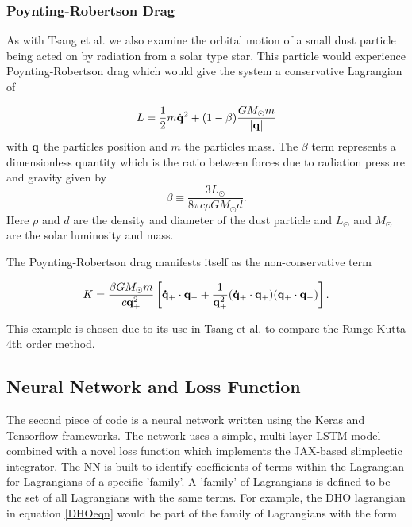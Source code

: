 \documentclass[10pt]{iopart}
\begin{document}
\subsubsection{Poynting-Robertson Drag \\}
\label{PRD}
As with Tsang et al. \cite{Tsang_Slimplectic} we also examine the orbital motion of a small dust particle being acted on by radiation from a solar type star. This particle would experience Poynting-Robertson drag \cite{Poynting-Robertson} which would give the system a conservative Lagrangian of 

\begin{equation}
	L = \frac{1}{2}m\dot{\bold{q}}^2 + (1-\beta)\frac{GM_\odot m}{|\bold{q}|}
\end{equation} 
with $\bold{q}$ the particles position and $m$ the particles mass. The $\beta$ term represents a dimensionless quantity which is the ratio between forces due to radiation pressure and gravity given by 
\begin{equation}
	\beta\equiv\frac{3L_\odot}{8\pi c\rho GM_\odot d}.
\end{equation}
Here $\rho$ and $d$ are the density and diameter of the dust particle and $L_\odot$ and $M_\odot$ are the solar luminosity and mass.

The Poynting-Robertson drag manifests itself as the non-conservative term

\begin{equation}
	K = \frac{\beta GM_\odot m}{c\bold{q}_+^2}\left[\bold{\dot{q}}_+\cdot \bold{q}_- + \frac{1}{\bold{q}_+^2}(\bold{\dot{q}}_+\cdot\bold{q}_+)(\bold{q}_+\cdot\bold{q}_-)\right].
\end{equation}

This example is chosen due to its use in Tsang et al. \cite{Tsang_Slimplectic} to compare the Runge-Kutta 4th order method.

\subsection{Neural Network and Loss Function}
The second piece of code is a neural network written using the Keras \cite{Keras} and Tensorflow \cite{TF} frameworks. The network uses a simple, multi-layer LSTM model \cite{LSTM} combined with a novel loss function which implements the JAX-based slimplectic integrator. The NN is built to identify coefficients of terms within the Lagrangian for Lagrangians of a specific 'family'. A 'family' of Lagrangians is defined to be the set of all Lagrangians with the same terms. For example, the DHO lagrangian in equation \ref{DHOeqn} would be part of the family of Lagrangians with the form 
\end{document}
